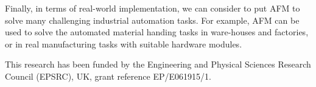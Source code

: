 \documentclass[smallcondensed]{svjour3}
\begin{document}
Finally, in terms of real-world implementation, we can consider to put AFM to solve many challenging industrial automation tasks. For example, AFM can be used to solve the automated material handing tasks in ware-houses and factories, or in real manufacturing tasks with suitable hardware modules. %
\begin{acknowledgements}
This research has been funded by the Engineering and Physical Sciences Research Council (EPSRC), UK, grant reference EP/E061915/1.
\end{acknowledgements}
\end{document}
